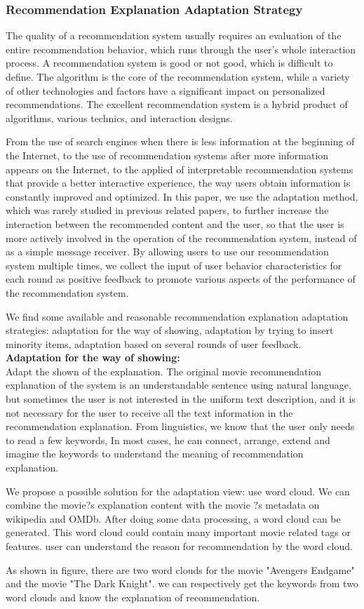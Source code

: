 \subsubsection{Recommendation Explanation Adaptation Strategy}
The quality of a recommendation system usually requires an evaluation of the entire recommendation behavior, which runs through the user's whole interaction process. A recommendation system is good or not good, which is difficult to define. The algorithm is the core of the recommendation system, while a variety of other technologies and factors have a significant impact on personalized recommendations. The excellent recommendation system is a hybrid product of algorithms, various technics, and interaction designs.
\par From the use of search engines when there is less information at the beginning of the Internet, to the use of recommendation systems after more information appears on the Internet, to the applied of interpretable recommendation systems that provide a better interactive experience, the way users obtain information is constantly improved and optimized. In this paper, we use the adaptation method, which was rarely studied in previous related papers, to further increase the interaction between the recommended content and the user, so that the user is more actively involved in the operation of the recommendation system, instead of as a simple message receiver. By allowing users to use our recommendation system multiple times, we collect the input of user behavior characteristics for each round as positive feedback to promote various aspects of the performance of the recommendation system.
\par We find some available and reasonable recommendation explanation adaptation strategies: adaptation for the way of showing, adaptation by trying to insert minority items, adaptation based on several rounds of user feedback.
\\
\textbf{Adaptation for the way of showing:}\\
Adapt the shown of the explanation. The original movie recommendation explanation of the system is an understandable sentence using natural language, but sometimes the user is not interested in the uniform text description, and it is not necessary for the user to receive all the text information in the recommendation explanation. From linguistics, we know that the user only needs to read a few keywords, In most cases, he can connect, arrange, extend and imagine the keywords to understand the meaning of recommendation explanation.
\par We propose a possible solution for the adaptation view: use word cloud. We can combine the movie?s explanation content with the movie ?s metadata on wikipedia and OMDb. After doing some data processing, a word cloud can be generated. This word cloud could contain many important movie related tags or features. user can understand the reason for recommendation by the word cloud.
\par As shown in figure, there are two word clouds for the movie "Avengers Endgame" and the movie "The Dark Knight". we can respectively get the keywords from two word clouds and know the explanation of recommendation.

